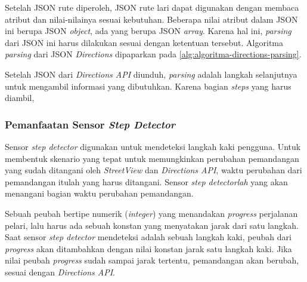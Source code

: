 Setelah JSON rute diperoleh, JSON rute lari dapat digunakan dengan membaca atribut dan nilai-nilainya sesuai kebutuhan. Beberapa nilai atribut dalam JSON ini  berupa JSON \textit{object}, ada yang berupa JSON \textit{array}. Karena hal ini,  \textit{parsing} dari JSON ini harus dilakukan sesuai dengan ketentuan tersebut. Algoritma \textit{parsing} dari JSON \textit{Directions} dipaparkan pada \ref{alg:algoritma-directions-parsing}. 

Setelah JSON dari \textit{Directions API} diunduh, \textit{parsing} adalah langkah selanjutnya untuk mengambil informasi yang dibutuhkan. Karena bagian \textit{steps} yang harus diambil, 

\subsubsection{Pemanfaatan Sensor \textit{Step Detector}}
Sensor \textit{step detector} digunakan untuk mendeteksi langkah kaki pengguna. Untuk membentuk skenario yang tepat untuk memungkinkan perubahan pemandangan yang sudah ditangani oleh \textit{StreetView} dan \textit{Directions API}, waktu perubahan dari pemandangan itulah yang harus ditangani. Sensor \textit{step detectorlah} yang akan menangani bagian waktu perubahan pemandangan. 

Sebuah peubah bertipe numerik (\textit{integer}) yang menandakan \textit{progress} perjalanan pelari, lalu harus ada sebuah konstan yang menyatakan jarak dari satu langkah. Saat sensor \textit{step detector} mendeteksi adalah sebuah langkah kaki, peubah dari \textit{progress} akan ditambahkan dengan nilai konstan jarak satu langkah kaki. Jika nilai peubah \textit{progress} sudah sampai  jarak tertentu, pemandangan akan berubah, sesuai dengan \textit{Directions API}. 

%
%
%
